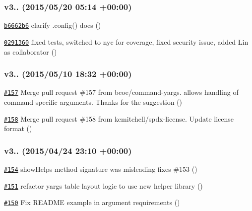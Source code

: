 \subsubsection*{v3.. (2015/05/20 05\+:14 +00\+:00)}


\begin{DoxyItemize}
\item \href{https://github.com/bcoe/yargs/commit/b6662b6774cfeab4876f41ec5e2f67b7698f4e2f}{\tt b6662b6} clarify .config() docs ()
\item \href{https://github.com/bcoe/yargs/commit/02913606285ce31ce81d7f12c48d8a3029776ec7}{\tt 0291360} fixed tests, switched to nyc for coverage, fixed security issue, added Lin as collaborator ()
\end{DoxyItemize}

\subsubsection*{v3.. (2015/05/10 18\+:32 +00\+:00)}


\begin{DoxyItemize}
\item \href{https://github.com/bcoe/yargs/pull/157}{\tt \#157} Merge pull request \#157 from bcoe/command-\/yargs. allows handling of command specific arguments. Thanks for the suggestion  ()
\item \href{https://github.com/bcoe/yargs/pull/158}{\tt \#158} Merge pull request \#158 from kemitchell/spdx-\/license. Update license format ()
\end{DoxyItemize}

\subsubsection*{v3.. (2015/04/24 23\+:10 +00\+:00)}


\begin{DoxyItemize}
\item \href{https://github.com/bcoe/yargs/pull/154}{\tt \#154} show\+Help\textquotesingle{}s method signature was misleading fixes \#153 ()
\item \href{https://github.com/bcoe/yargs/pull/151}{\tt \#151} refactor yargs\textquotesingle{} table layout logic to use new helper library ()
\item \href{https://github.com/bcoe/yargs/pull/150}{\tt \#150} Fix R\+E\+A\+D\+ME example in argument requirements ()
\end{DoxyItemize}

